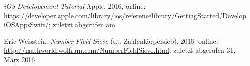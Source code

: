 \documentclass[letterpaper, 12pt]{article}
\begin{document}
\parindent 0pt
\parskip 6pt



\clearpage
\thispagestyle{empty}
\tableofcontents

\newpage
{}
\pagestyle{fancy}





\clearpage

\begin{thebibliography}{9}

    \emph{iOS Developement Tutorial}
    Apple,
    2016,
    online: \url{https://developer.apple.com/library/ios/referencelibrary/GettingStarted/DevelopiOSAppsSwift/};
    zuletzt abgerufen am 

Eric Weisstein,
    \emph{Number Field Sieve} (dt. Zahlenkörpersieb),
    2016,
    online: \url{http://mathworld.wolfram.com/NumberFieldSieve.html};
    zuletzt abgerufen 31. März 2016.

\end{thebibliography}
\end{document}
